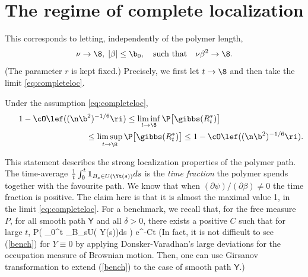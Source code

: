 \section{The regime of complete localization}
This corresponds to letting, independently of the polymer length, 
\begin{equation} \label{eq:completeloc}
\nu \to \8, \;|\beta|\leq \b_0, \quad {\rm such\ that} \quad \nu \beta^2 \to \8.
\end{equation}
(The parameter $r$ is kept fixed.) Precisely, we first let $t \to \8$ and then take the limit \eqref{eq:completeloc}.
\begin{theorem}
Under the assumption \eqref{eq:completeloc}, 
\begin{eqnarray*}
 1-\cO \lef( (\n \b^2)^{-1/6}\ri) \leq 
\liminf_{t \to \8}  \P\big[  \gibbs  (R_t^*) \big]   \qquad \qquad \qquad \qquad \qquad\\ \qquad\qquad \qquad \qquad \qquad 
 \leq  \limsup_{t \to \8}  \P\big[  \gibbs  (R_t^*) \big]  \leq 1-\cO \lef( (\n \b^2)^{-1/6}\ri).
\end{eqnarray*}
\end{theorem}
This statement describes the strong localization properties of the polymer path. 
The time-average $\frac 1t \int_0^t  
{\mathbf 1}_{B_s\in U(\Yt(s))}ds$ is the {\em time fraction} the polymer spends together with the favourite path. We know that when $(\partial \psi)/(\partial \beta) \neq 0$
the time fraction is positive. The claim here is that it is almost  the maximal value 1, in the limit  \eqref{eq:completeloc}. 
For a benchmark, we recall that, for the free measure $P$, 
for all smooth path ${\mathsf Y}$ and all $\delta>0$, there exists 
a positive $C$ such that for large $t$,
P\left(  \int_0^t  
{}_{B_s\in U( {\mathsf Y}(s))}ds  \geq \delta \right)  \leq e^{-Ct}
\edn
(In fact, it is not difficult to see (\ref{bench}) for $Y \equiv 0$ by 
applying Donsker-Varadhan's large deviations \cite{donskervaradhan-wienersaus} for the occupation measure of Brownian motion. 
Then, one can 
use Girsanov transformation to extend (\ref{bench}) to the case of 
smooth path ${\mathsf Y}$.)
